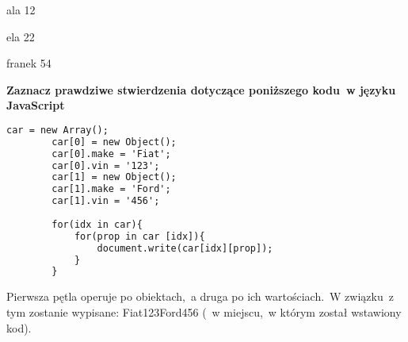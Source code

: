 ala  12

ela  22

franek  54
\vspace{0.4cm}

\textbf{Zaznacz prawdziwe stwierdzenia dotyczące poniższego kodu~w języku JavaScript}
\begin{lstlisting}[language=html]
		car = new Array();
		car[0] = new Object();
		car[0].make = 'Fiat';
		car[0].vin = '123';
		car[1] = new Object();
		car[1].make = 'Ford';
		car[1].vin = '456';
		
		for(idx in car){
			for(prop in car [idx]){
				document.write(car[idx][prop]);
			}
		}
\end{lstlisting}

\vspace{0.4cm}
\noindent
Pierwsza pętla operuje po obiektach,~a druga po ich wartościach.~W związku~z tym zostanie wypisane: Fiat123Ford456 (~w miejscu,~w którym został wstawiony kod).